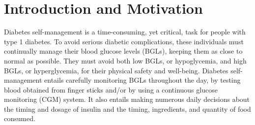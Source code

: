 \documentclass[journal,article,submit,moreauthors,pdftex]{Definitions/mdpi}
\begin{document}

\section{Introduction and Motivation}


Diabetes self-management is a time-consuming, yet critical, task for people with type 1 diabetes.  To avoid serious diabetic complications, these individuals must continually manage their blood glucose levels (BGLs), keeping them as close to normal as possible.  They must avoid both low BGLs, or hypoglycemia, and high BGLs, or hyperglycemia, for their physical safety and well-being.  Diabetes self-management entails carefully monitoring BGLs throughout the day, by testing blood obtained from finger sticks and/or by using a continuous glucose monitoring (CGM) system.  It also entails making numerous daily decisions about the timing and dosage of insulin and the timing, ingredients, and quantity of food consumed.
\end{document}
